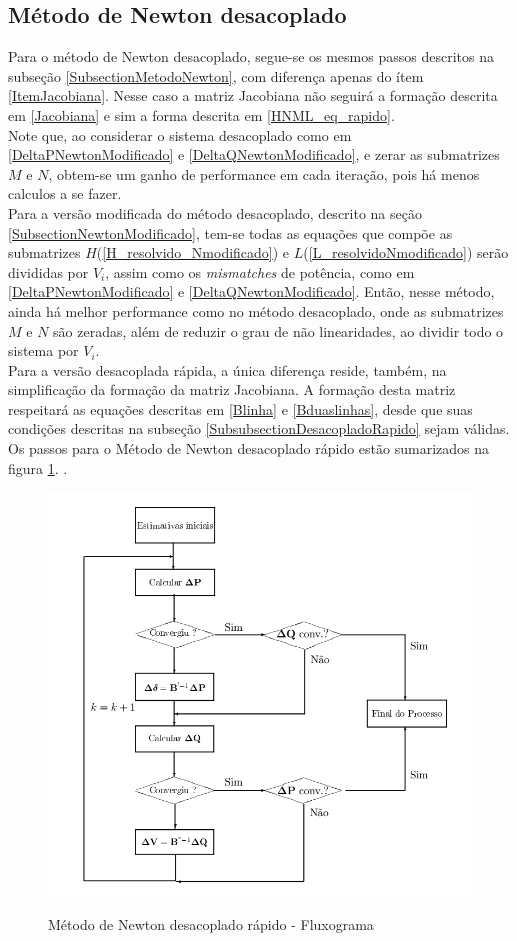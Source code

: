 \subsection{Método de Newton desacoplado}

Para o método de Newton desacoplado, segue-se os mesmos passos descritos na subseção \ref{SubsectionMetodoNewton}, com diferença apenas do ítem \ref{ItemJacobiana}. Nesse caso a matriz Jacobiana não seguirá a formação descrita em \ref{Jacobiana} e sim a forma descrita em \ref{HNML_eq_rapido}.\\
Note que, ao considerar o sistema desacoplado como em \ref{DeltaPNewtonModificado} e \ref{DeltaQNewtonModificado}, e zerar as submatrizes $M$ e $N$, obtem-se um ganho de performance em cada iteração, pois há menos calculos a se fazer.\\
Para a versão modificada do método desacoplado, descrito na seção \ref{SubsectionNewtonModificado}, tem-se todas as equações que compõe as submatrizes $H$(\ref{H_resolvido_Nmodificado}) e $L$(\ref{L_resolvidoNmodificado}) serão divididas por $V_i$, assim como os \textit{mismatches} de potência, como em \ref{DeltaPNewtonModificado} e \ref{DeltaQNewtonModificado}. Então, nesse método, ainda há melhor performance como no método desacoplado, onde as submatrizes $M$ e $N$ são zeradas, além de reduzir o grau de não linearidades, ao dividir todo o sistema por $V_i$.\\
Para a versão desacoplada rápida, a única diferença reside, também, na simplificação da formação da matriz Jacobiana. A formação desta matriz respeitará as equações descritas em \ref{Blinha} e \ref{Bduaslinhas}, desde que suas condições descritas na subseção \ref{SubsubsectionDesacopladoRapido} sejam válidas.\\
Os passos para o Método de Newton desacoplado rápido estão sumarizados na figura \ref{FigNewtonRapidoFluxograma}. \cite{fpdr}.
\begin{figure}[!htb]
\caption{Método de Newton desacoplado rápido - Fluxograma}
 \centering %
\includegraphics[width=12cm]{figuras/fluxograma.PNG} 
\label{FigNewtonRapidoFluxograma}
\end{figure}